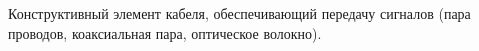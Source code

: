 Конструктивный элемент кабеля, обеспечивающий передачу сигналов
(пара проводов, коаксиальная пара, оптическое волокно).